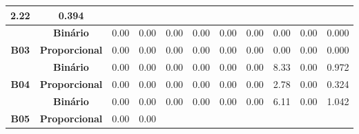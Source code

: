 \begin{table}[htbp]
\begin{tabular}{|c|cccccccccc|}
		\multicolumn{1}{c|}{\cellcolor[HTML]{F2F2F2}2.22} &
		\cellcolor[HTML]{F2F2F2}0.394 \\ \hline
		&
		\multicolumn{1}{c|}{\textbf{Binário}} &
		\multicolumn{1}{c|}{0.00} &
		\multicolumn{1}{c|}{0.00} &
		\multicolumn{1}{c|}{0.00} &
		\multicolumn{1}{c|}{0.00} &
		\multicolumn{1}{c|}{0.00} &
		\multicolumn{1}{c|}{0.00} &
		\multicolumn{1}{c|}{0.00} &
		\multicolumn{1}{c|}{0.00} &
		0.000 \\ \cline{2-11} 
		\multirow{-2}{*}{\textbf{B03}} &
		\multicolumn{1}{c|}{\cellcolor[HTML]{F2F2F2}\textbf{Proporcional}} &
		\multicolumn{1}{c|}{\cellcolor[HTML]{F2F2F2}0.00} &
		\multicolumn{1}{c|}{\cellcolor[HTML]{F2F2F2}0.00} &
		\multicolumn{1}{c|}{\cellcolor[HTML]{F2F2F2}0.00} &
		\multicolumn{1}{c|}{\cellcolor[HTML]{F2F2F2}0.00} &
		\multicolumn{1}{c|}{\cellcolor[HTML]{F2F2F2}0.00} &
		\multicolumn{1}{c|}{\cellcolor[HTML]{F2F2F2}0.00} &
		\multicolumn{1}{c|}{\cellcolor[HTML]{F2F2F2}0.00} &
		\multicolumn{1}{c|}{\cellcolor[HTML]{F2F2F2}0.00} &
		\cellcolor[HTML]{F2F2F2}0.000 \\ \hline
		&
		\multicolumn{1}{c|}{\textbf{Binário}} &
		\multicolumn{1}{c|}{0.00} &
		\multicolumn{1}{c|}{0.00} &
		\multicolumn{1}{c|}{0.00} &
		\multicolumn{1}{c|}{0.00} &
		\multicolumn{1}{c|}{0.00} &
		\multicolumn{1}{c|}{0.00} &
		\multicolumn{1}{c|}{8.33} &
		\multicolumn{1}{c|}{0.00} &
		0.972 \\ \cline{2-11} 
		\multirow{-2}{*}{\textbf{B04}} &
		\multicolumn{1}{c|}{\cellcolor[HTML]{F2F2F2}\textbf{Proporcional}} &
		\multicolumn{1}{c|}{\cellcolor[HTML]{F2F2F2}0.00} &
		\multicolumn{1}{c|}{\cellcolor[HTML]{F2F2F2}0.00} &
		\multicolumn{1}{c|}{\cellcolor[HTML]{F2F2F2}0.00} &
		\multicolumn{1}{c|}{\cellcolor[HTML]{F2F2F2}0.00} &
		\multicolumn{1}{c|}{\cellcolor[HTML]{F2F2F2}0.00} &
		\multicolumn{1}{c|}{\cellcolor[HTML]{F2F2F2}0.00} &
		\multicolumn{1}{c|}{\cellcolor[HTML]{F2F2F2}2.78} &
		\multicolumn{1}{c|}{\cellcolor[HTML]{F2F2F2}0.00} &
		\cellcolor[HTML]{F2F2F2}0.324 \\ \hline
		&
		\multicolumn{1}{c|}{\textbf{Binário}} &
		\multicolumn{1}{c|}{0.00} &
		\multicolumn{1}{c|}{0.00} &
		\multicolumn{1}{c|}{0.00} &
		\multicolumn{1}{c|}{0.00} &
		\multicolumn{1}{c|}{0.00} &
		\multicolumn{1}{c|}{0.00} &
		\multicolumn{1}{c|}{6.11} &
		\multicolumn{1}{c|}{0.00} &
		1.042 \\ \cline{2-11} 
		\multirow{-2}{*}{\textbf{B05}} &
		\multicolumn{1}{c|}{\cellcolor[HTML]{F2F2F2}\textbf{Proporcional}} &
		\multicolumn{1}{c|}{\cellcolor[HTML]{F2F2F2}0.00} &
		\multicolumn{1}{c|}{\cellcolor[HTML]{F2F2F2}0.00} &

\end{tabular}
\end{table}
